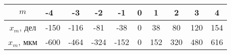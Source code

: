 \begin{tabular}{|c|p{0.7cm}|c|c|c|c|c|c|c|c|}
\hline
$m$&-4&-3&-2&-1&0&1&2&3&4\\
\hline
$x_m$, дел&-150&-116&-81&-38&0&38&80&120&154\\
\hline
$x_m$, мкм&-600&-464&-324&-152&0&152&320&480&616\\
\hline
\end{tabular}
